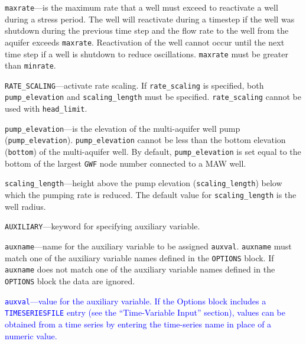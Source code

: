 \item \texttt{maxrate}---is the maximum rate that a well must exceed to reactivate a well during a stress period. The well will reactivate during a timestep if the well was shutdown during the previous time step and the flow rate to the well from the aquifer exceeds \texttt{maxrate}. Reactivation of the well cannot occur until the next time step if a well is shutdown to reduce oscillations. \texttt{maxrate} must be greater than \texttt{minrate}.

\item \texttt{RATE\_SCALING}---activate rate scaling.  If \texttt{rate\_scaling} is specified, both \texttt{pump\_elevation} and \texttt{scaling\_length} must be specified. \texttt{rate\_scaling} cannot be used with \texttt{head\_limit}.

\item \texttt{pump\_elevation}---is the elevation of the multi-aquifer well pump (\texttt{pump\_elevation}).  \texttt{pump\_elevation} cannot be less than the bottom elevation (\texttt{bottom}) of the multi-aquifer well. By default, \texttt{pump\_elevation} is set equal to the bottom of the largest \texttt{GWF} node number connected to a MAW well.

\item \texttt{scaling\_length}---height above the pump elevation (\texttt{scaling\_length}) below which the pumping rate is reduced.  The default value for \texttt{scaling\_length} is the well radius.

\item \texttt{AUXILIARY}---keyword for specifying auxiliary variable.

\item \texttt{auxname}---name for the auxiliary variable to be assigned \texttt{auxval}.  \texttt{auxname} must match one of the auxiliary variable names defined in the \texttt{OPTIONS} block. If \texttt{auxname} does not match one of the auxiliary variable names defined in the \texttt{OPTIONS} block the data are ignored.

\item \textcolor{blue}{\texttt{auxval}---value for the auxiliary variable. If the Options block includes a \texttt{TIMESERIESFILE} entry (see the ``Time-Variable Input'' section), values can be obtained from a time series by entering the time-series name in place of a numeric value.}


